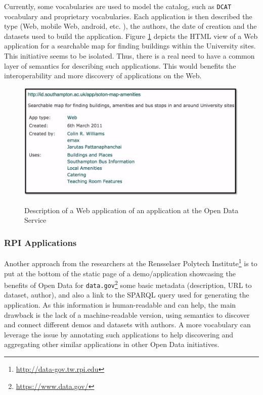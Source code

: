Currently, some vocabularies are used to model the catalog, such as \texttt{DCAT} vocabulary \cite{dcat} and proprietary vocabularies. Each application is then described the type (Web, mobile Web, android, etc. ), the authors, the date of creation and the datasets used to build the application. Figure \ref{fig:app-amenity} depicts the HTML view of a Web application
for a searchable map for finding buildings within the University sites. This initiative seems to be isolated. Thus, there is a real need to have a common layer of semantics for describing such applications. This would benefits the interoperability and more discovery of applications on the Web.
\begin{figure}
\includegraphics[scale=.7]{img/soton-map-amenities.pdf}
\label{fig:app-amenity}
\vspace{-10pt}
\caption{Description of a Web application of an application at the Open Data Service}
\end{figure}

\subsubsection{RPI Applications}
Another approach from the researchers at the Rensselaer Polytech Institute\footnote{\url{http://data-gov.tw.rpi.edu}} is to put at the bottom of the static page of a demo/application showcasing the benefits of Open Data for \texttt{data.gov}\footnote{\url{https://www.data.gov/}} some basic metadata (description, URL to dataset, author), and also a link to the SPARQL query used for generating the application. As this information is human-readable and can help, the main drawback is the lack of a machine-readable version, using semantics to discover and connect different demos and datasets with authors. A more vocabulary can leverage the issue by annotating such applications to help discovering and aggregating other similar applications in other Open Data initiatives.


